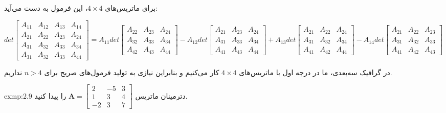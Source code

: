 {\begin{spacing}{1.3}
        برای ماتریس‌های $4\times 4$، این فرمول به دست می‌آید:

        \begin{flushleft}
            $det\begin{bmatrix}
                    A_{11} & A_{12} & A_{13} & A_{14} \\
                    A_{21} & A_{22} & A_{23} & A_{24} \\
                    A_{31} & A_{32} & A_{33} & A_{34} \\
                    A_{31} & A_{32} & A_{33} & A_{44}
            \end{bmatrix}=A_{11}det\begin{bmatrix}
                                       A_{22} & A_{23} & A_{24} \\
                                       A_{32} & A_{33} & A_{34} \\
                                       A_{42} & A_{43} & A_{44}
            \end{bmatrix}-A_{12}det\begin{bmatrix}
                                       A_{21} & A_{23} & A_{24} \\
                                       A_{31} & A_{33} & A_{34} \\
                                       A_{41} & A_{43} & A_{44}
            \end{bmatrix}+A_{13}det\begin{bmatrix}
                                       A_{21} & A_{22} & A_{24} \\
                                       A_{31} & A_{32} & A_{34} \\
                                       A_{41} & A_{42} & A_{44}
            \end{bmatrix}-A_{14}det\begin{bmatrix}
                                       A_{21} & A_{22} & A_{23} \\
                                       A_{31} & A_{32} & A_{33} \\
                                       A_{41} & A_{42} & A_{43}
            \end{bmatrix}$
        \end{flushleft}

        در گرافیک سه‌بعدی، ما در درجه اول با ماتریس‌های $4\times 4$ کار می‌کنیم و بنابراین نیازی به تولید فرمول‌های صریح برای $n>4$ نداریم.

        \begin{exmp}{exmp:2.9}
            \Large
            دترمینان ماتریس $\textbf{A}=\begin{bmatrix}
                                            2  & -5 & 3 \\
                                            1  & 3  & 4 \\
                                            -2 & 3  & 7
            \end{bmatrix}$ را پیدا کنید.


\end{exmp}
\end{spacing}}
